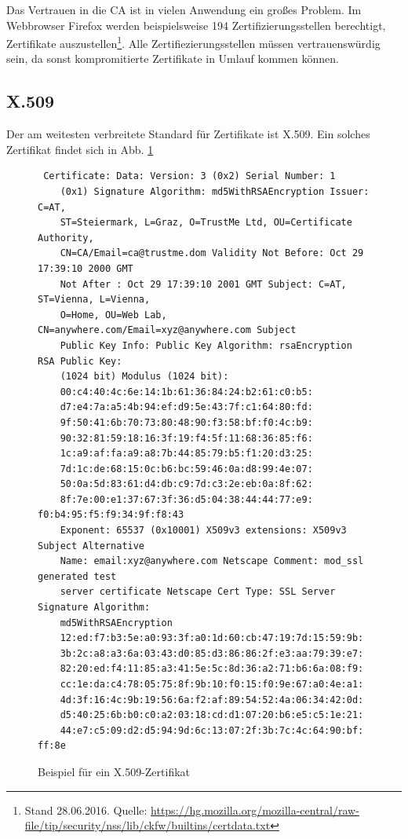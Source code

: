 Das Vertrauen in die CA ist in vielen Anwendung ein großes Problem. Im
Webbrowser Firefox werden beispielsweise 194 Zertifizierungsstellen
berechtigt, Zertifikate auszustellen\footnote{Stand 28.06.2016. Quelle:
  \url{https://hg.mozilla.org/mozilla-central/raw-file/tip/security/nss/lib/ckfw/builtins/certdata.txt}}. Alle
Zertifiezierungsstellen müssen vertrauenswürdig sein, da sonst
kompromitierte Zertifikate in Umlauf kommen können.

\subsection{X.509}\indexXFiveZeroNine Der am weitesten verbreitete
Standard für Zertifikate ist X.509. Ein solches Zertifikat findet sich
in Abb. \ref{fig:x509}
\begin{figure}
  \begin{lstlisting} Certificate: Data: Version: 3 (0x2) Serial Number: 1
    (0x1) Signature Algorithm: md5WithRSAEncryption Issuer: C=AT,
    ST=Steiermark, L=Graz, O=TrustMe Ltd, OU=Certificate Authority,
    CN=CA/Email=ca@trustme.dom Validity Not Before: Oct 29 17:39:10 2000 GMT
    Not After : Oct 29 17:39:10 2001 GMT Subject: C=AT, ST=Vienna, L=Vienna,
    O=Home, OU=Web Lab, CN=anywhere.com/Email=xyz@anywhere.com Subject
    Public Key Info: Public Key Algorithm: rsaEncryption RSA Public Key:
    (1024 bit) Modulus (1024 bit):
    00:c4:40:4c:6e:14:1b:61:36:84:24:b2:61:c0:b5:
    d7:e4:7a:a5:4b:94:ef:d9:5e:43:7f:c1:64:80:fd:
    9f:50:41:6b:70:73:80:48:90:f3:58:bf:f0:4c:b9:
    90:32:81:59:18:16:3f:19:f4:5f:11:68:36:85:f6:
    1c:a9:af:fa:a9:a8:7b:44:85:79:b5:f1:20:d3:25:
    7d:1c:de:68:15:0c:b6:bc:59:46:0a:d8:99:4e:07:
    50:0a:5d:83:61:d4:db:c9:7d:c3:2e:eb:0a:8f:62:
    8f:7e:00:e1:37:67:3f:36:d5:04:38:44:44:77:e9: f0:b4:95:f5:f9:34:9f:f8:43
    Exponent: 65537 (0x10001) X509v3 extensions: X509v3 Subject Alternative
    Name: email:xyz@anywhere.com Netscape Comment: mod_ssl generated test
    server certificate Netscape Cert Type: SSL Server Signature Algorithm:
    md5WithRSAEncryption
    12:ed:f7:b3:5e:a0:93:3f:a0:1d:60:cb:47:19:7d:15:59:9b:
    3b:2c:a8:a3:6a:03:43:d0:85:d3:86:86:2f:e3:aa:79:39:e7:
    82:20:ed:f4:11:85:a3:41:5e:5c:8d:36:a2:71:b6:6a:08:f9:
    cc:1e:da:c4:78:05:75:8f:9b:10:f0:15:f0:9e:67:a0:4e:a1:
    4d:3f:16:4c:9b:19:56:6a:f2:af:89:54:52:4a:06:34:42:0d:
    d5:40:25:6b:b0:c0:a2:03:18:cd:d1:07:20:b6:e5:c5:1e:21:
    44:e7:c5:09:d2:d5:94:9d:6c:13:07:2f:3b:7c:4c:64:90:bf: ff:8e
  \end{lstlisting}
  \caption{Beispiel für ein X.509-Zertifikat}
  \label{fig:x509}
\end{figure}

